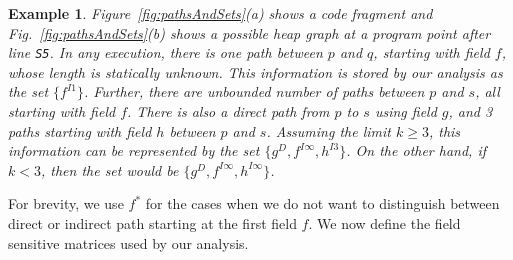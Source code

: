 \documentclass[letterpaper]{sig-alternate}
\newtheorem{example}{Example}
\newcommand{\p}{\ensuremath{p}}
\newcommand{\q}{\ensuremath{q}}
\newcommand{\s}{\ensuremath{s}}
\newcommand{\drct}{\ensuremath{D}}
\newcommand{\indrct}{\ensuremath{I}}
\newcommand{\fieldI}[3]{\ensuremath{{#1}_{#2}^{\indrct#3}}}
\begin{document}
\begin{example}
{ 

Figure~\ref{fig:pathsAndSets}(a) shows a code fragment and
Fig.~\ref{fig:pathsAndSets}(b) shows a possible heap graph
at a program point after line {\tt S5}. In any execution, there is one path
between $\p$ and $\q$, starting with field $f$, whose
length is statically unknown. This information is stored by
our analysis as the set $\{\fieldI{f}{}{1}\}$. Further, there are
unbounded number of paths between $\p$ and $\s$, all
starting with field $f$. There is also a direct path from
$\p$ to $\s$ using field $g$, and 3 paths starting with
field $h$ between $\p$ and $\s$. Assuming the limit $k
\geq 3$, this information can be represented by the set $\{
g^\drct, f^{\indrct\infty}, h^{\indrct 3} \}$. On the other hand, if $k < 3$,
then the set would be $\{ g^\drct, f^{\indrct\infty}, h^{\indrct\infty} \}$.
  } \hfill\psframebox{}
\end{example}

\newcommand{\anysup}{\ensuremath{\ast}} For brevity, we use
$f^{\anysup}$ for the cases when we do not want to
distinguish between direct or indirect path starting at the
first field $f$. We now define the field sensitive matrices
used by our analysis.
\end{document}
